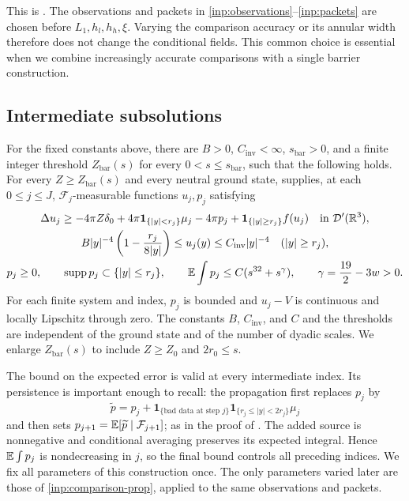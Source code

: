 This is \cite[\FoundationComparison]{OuterRadius}.
The observations and packets in \eqref{inp:observations}--\eqref{inp:packets}
are chosen before $L_1,h_l,h_h,\xi$.  Varying the comparison accuracy or
its annular width therefore does not change the conditional fields.
This common choice is essential when we combine increasingly accurate
comparisons with a single barrier construction.

\subsection{Intermediate subsolutions}

\begin{proposition}
\label{inp:barrier-prop}
For the fixed constants above, there are $B>0$, $C_{\mathrm{inv}}<\infty$,
$s_{\mathrm{bar}}>0$, and a finite integer threshold
$Z_{\mathrm{bar}}(s)$ for every $0<s\le s_{\mathrm{bar}}$, such that
the following holds.  For every $Z\ge Z_{\mathrm{bar}}(s)$ and
every neutral ground state,
\cite[\FoundationIntermediate]{OuterRadius} supplies, at each $0\le j\le J$,
$\mathcal F_j$-measurable functions $u_j,p_j$ satisfying
\begin{equation}\label{inp:barriers}
 \begin{gathered}
 \Delta u_j\ge-4\pi Z\delta_0+
     4\pi\mathbf1_{\{|y|<r_j\}}\mu_j-4\pi p_j+
     \mathbf1_{\{|y|\ge r_j\}}f(u_j)
       \quad\hbox{in }\mathcal D'(\mathbb R^3),\\
 B|y|^{-4}\left(1-\frac{r_j}{8|y|}\right)
       \le u_j(y)\le C_{\mathrm{inv}}|y|^{-4}
       \quad (|y|\ge r_j),\\
 p_j\ge0,\qquad \operatorname{supp} p_j\subset\{|y|\le r_j\},\qquad
 \mathbb E\int p_j\le C(s^{32}+s^\gamma),\qquad
 \gamma=\frac{19}{2}-3w>0.
 \end{gathered}
\end{equation}
For each finite system and index, $p_j$ is bounded and $u_j-V$ is
continuous and locally Lipschitz through zero.  The constants $B$,
$C_{\mathrm{inv}}$, and $C$ and the thresholds are independent of the
ground state and of the number of dyadic scales.
We enlarge $Z_{\mathrm{bar}}(s)$ to include $Z\ge Z_0$ and $2r_0\le s$.
\end{proposition}

The bound on the expected error is valid at every intermediate index.
Its persistence is important enough to recall: the propagation first
replaces $p_j$ by
\[
 \widetilde p=p_j+
   \mathbf1_{\{\text{bad data at step }j\}}
   \mathbf1_{\{r_j\le|y|<2r_j\}}\mu_j
\]
and then sets
$p_{j+1}=\mathbb E[\widetilde p\mid\mathcal F_{j+1}]$;
as in the proof of \cite[\FoundationIntermediate]{OuterRadius}.
The added source is nonnegative and conditional averaging preserves its
expected integral.  Hence $\mathbb E\int p_j$ is nondecreasing in $j$,
so the final bound controls all preceding indices.
We fix all parameters of this construction once.  The only parameters
varied later are those of \cref{inp:comparison-prop}, applied to the same
observations and packets.


